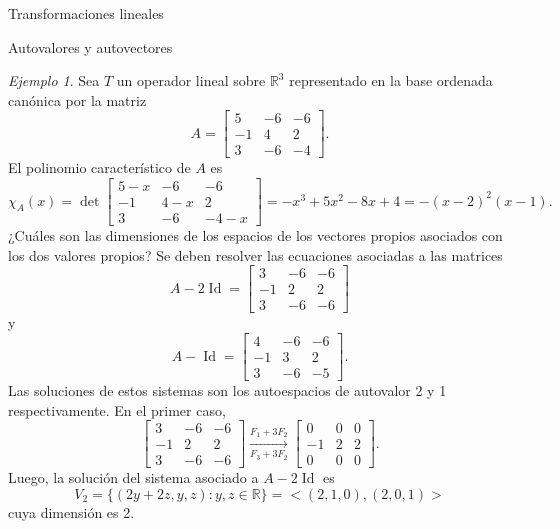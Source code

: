 \documentclass[a4paper,12pt,twoside,spanish,reqno]{amsbook}
\numberwithin{equation}{section}
\theoremstyle{definition}
\theoremstyle{remark}
\newtheorem*{ejemplo*}{Ejemplo}
\newcommand{\Id}{\operatorname{Id}}
\newcommand{\R}{\mathbb R}
\begin{document}
\begin{chapter}{Transformaciones lineales}
\begin{section}{Autovalores y autovectores}
        \begin{ejemplo*}
            Sea $T$ un operador lineal sobre $\R^3$  representado en la base ordenada canónica por la matriz
            \begin{equation*}
                A = 
                \begin{bmatrix}
                5 &-6 &-6\\ -1& 4& 2\\3 &-6& -4
                \end{bmatrix}.
            \end{equation*}
            El  polinomio característico de $A$ es
            \begin{equation*}
                \chi_A(x) = \det \begin{bmatrix}
                    5-x &-6 &-6\\ -1& 4-x& 2\\3 &-6& -4-x
                \end{bmatrix} 
                = -x^3 + 5 x^2 - 8 x + 4 = -(x-2)^2(x-1).
            \end{equation*}
            ¿Cuáles son las dimensiones de los espacios de los vectores propios asociados
            con los dos valores propios? Se deben resolver las ecuaciones asociadas a las matrices
            \begin{equation*}
            A - 2 \Id = 
            \begin{bmatrix}
            3 &-6 &-6\\ -1& 2& 2\\3 &-6& -6
            \end{bmatrix} 
            \end{equation*}
            y 
            \begin{equation*}
            A -\Id= 
            \begin{bmatrix}
            4 &-6 &-6\\ -1& 3& 2\\3 &-6& -5
            \end{bmatrix}.
            \end{equation*}
            Las soluciones de estos sistemas son los autoespacios de autovalor 2 y 1 respectivamente. En  el primer caso, 
            \begin{equation*}
            \begin{bmatrix} 3 &-6 &-6\\ -1& 2& 2\\3 &-6& -6 \end{bmatrix}
            \underset{F_3+3F_2}{\stackrel{F_1+3 F_2}{\longrightarrow}} 
            \begin{bmatrix} 0 &0 &0\\ -1& 2& 2\\0 &0& 0 \end{bmatrix}.
            \end{equation*}
            Luego,  la solución del sistema asociado a $A-2\Id$ es 
            $$
            V_2 = \{(2y+2z,y,z): y,z \in \R\} = <(2,1,0),(2,0,1)>
            $$
            cuya dimensión es 2. 
            

\end{ejemplo*}
\end{section}
\end{chapter}
\end{document}
